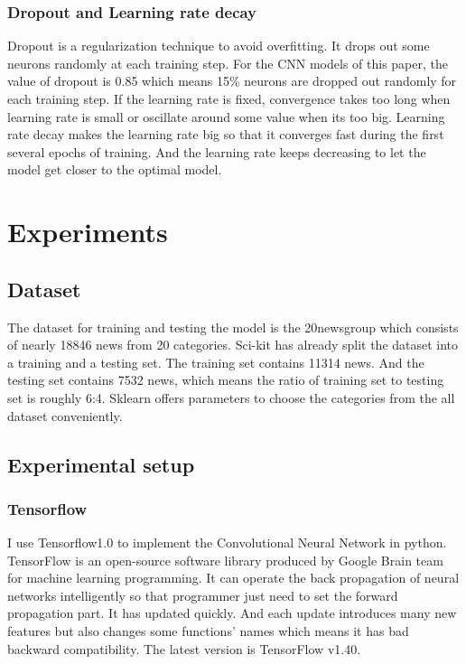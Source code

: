 \documentclass[12pt]{spieman}
\begin{document}
\begin{spacing}{1.5}
        \subsubsection{Dropout and Learning rate decay}
        Dropout is a regularization technique to avoid overfitting. It drops out some neurons randomly at each training step. For the CNN models of this paper, the value of dropout is 0.85 which means 15\% neurons are dropped out randomly for each training step.
        If the learning rate is fixed, convergence takes too long when learning rate is small or oscillate around some value when its too big. Learning rate decay makes the learning rate big so that it converges fast during the first several epochs of training. And the learning rate keeps decreasing to let the model get closer to the optimal model.

\section{Experiments}

    \subsection{Dataset}
    The dataset for training and testing the model is the 20newsgroup which consists of nearly 18846 news from 20 categories. Sci-kit has already split the dataset into a training and a testing set. The training set contains 11314 news. And the testing set contains 7532 news, which means the ratio of training set to testing set is roughly 6:4. Sklearn offers parameters to choose the categories from the all dataset conveniently.
    \subsection{Experimental setup}
        \subsubsection{Tensorflow}
        I use Tensorflow1.0 to implement the Convolutional Neural Network in python. TensorFlow is an open-source software library produced by Google Brain team for machine learning programming. It can operate the back propagation of neural networks intelligently so that programmer just need to set the forward propagation part. It has updated quickly. And each update introduces many new features but also changes some functions' names which means it has bad backward compatibility. The latest version is TensorFlow v1.40.

\end{spacing}
\end{document}
